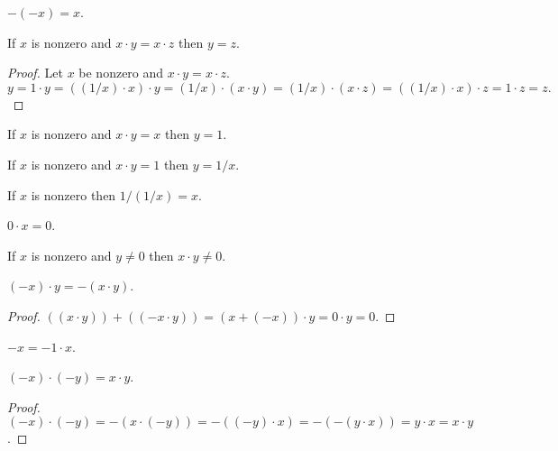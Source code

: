 \documentclass{article}
\begin{document}
\begin{forthel}
\begin{proposition}[1 14 d]
$-(-x) = x$.
\end{proposition}


\begin{proposition}[1 15 a]
If $x$ is nonzero and $x \cdot y = x \cdot z$
then $y = z$.
\end{proposition}
\begin{proof}
Let $x$ be nonzero and $x \cdot y = x \cdot z$.
\[ y = 1 \cdot y = ((1/x) \cdot x) \cdot y = (1/x) \cdot (x \cdot y) =
(1/x) \cdot (x \cdot z) = ((1/x) \cdot x) \cdot z = 1 \cdot z = z. \]
\end{proof}

\begin{proposition}[1 15 b]
If $x$ is nonzero and $x \cdot y = x$ then $y = 1$.
\end{proposition}

\begin{proposition}[1 15 c]
If $x$ is nonzero and $x \cdot y = 1$ then $y = 1/x$.
\end{proposition}

\begin{proposition}[1 15 d]
If $x$ is nonzero then $1/(1/x) = x$.
\end{proposition}

\begin{proposition}[1 16 a]
$0 \cdot x = 0$.
\end{proposition}

\begin{proposition}[1 16 b]
If $x$ is nonzero and $y \neq 0$ then $x \cdot y \neq 0$.
\end{proposition}

\begin{proposition}[1 16 c]
$(-x) \cdot y = -(x \cdot y)$.
\end{proposition}
\begin{proof}
$((x \cdot y)) + ((-x \cdot y)) = (x + (-x)) \cdot y
= 0 \cdot y = 0$.
\end{proof}

\begin{proposition}
$-x = -1 \cdot x$.
\end{proposition}

\begin{proposition}[1 16d]
$(-x) \cdot (-y) = x \cdot y$.
\end{proposition}
\begin{proof}
$(-x)\cdot (-y) = -(x\cdot(-y)) = -((-y)\cdot x) =
-(-(y\cdot x)) = y\cdot x = x\cdot y$.
\end{proof}


\end{forthel}
\end{document}
